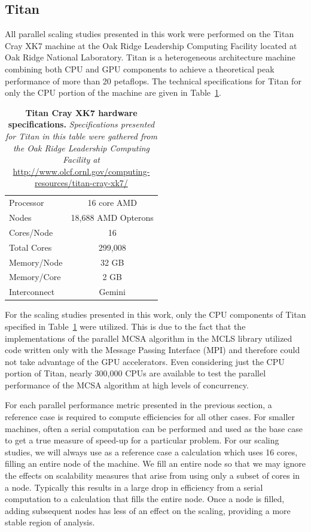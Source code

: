 \subsection{Titan }
\label{subsec:titan}
All parallel scaling studies presented in this work were performed on
the Titan Cray XK7 machine at the Oak Ridge Leadership Computing
Facility located at Oak Ridge National Laboratory. Titan is a
heterogeneous architecture machine combining both CPU and GPU
components to achieve a theoretical peak performance of more than 20
petaflops. The technical specifications for Titan for only the CPU
portion of the machine are given in Table~\ref{tab:titan_hardware}.

\begin{table}[h!]
  \begin{center}
    \begin{tabular}{lc}\hline\hline
      Processor & 16 core AMD \\
      Nodes & 18,688 AMD Opterons \\
      Cores/Node & 16 \\
      Total Cores & 299,008 \\
      Memory/Node & 32 GB \\
      Memory/Core & 2 GB \\
      Interconnect & Gemini \\
      \hline\hline
    \end{tabular}
  \end{center}
  \caption{\textbf{Titan Cray XK7 hardware specifications.}
    \textit{Specifications presented for Titan in this table were
      gathered from the Oak Ridge Leadership Computing Facility at}
    \url{http://www.olcf.ornl.gov/computing-resources/titan-cray-xk7/}}
  \label{tab:titan_hardware}
\end{table}

For the scaling studies presented in this work, only the CPU
components of Titan specified in Table~\ref{tab:titan_hardware} were
utilized. This is due to the fact that the implementations of the
parallel MCSA algorithm in the MCLS library utilized code written only
with the Message Passing Interface (MPI) and therefore could not take
advantage of the GPU accelerators. Even considering just the CPU
portion of Titan, nearly 300,000 CPUs are available to test the
parallel performance of the MCSA algorithm at high levels of
concurrency.

For each parallel performance metric presented in the previous
section, a reference case is required to compute efficiencies for all
other cases. For smaller machines, often a serial computation can be
performed and used as the base case to get a true measure of speed-up
for a particular problem. For our scaling studies, we will always use
as a reference case a calculation which uses 16 cores, filling an
entire node of the machine. We fill an entire node so that we may
ignore the effects on scalability measures that arise from using only
a subset of cores in a node. Typically this results in a large drop in
efficiency from a serial computation to a calculation that fills the
entire node. Once a node is filled, adding subsequent nodes has less
of an effect on the scaling, providing a more stable region of
analysis.

